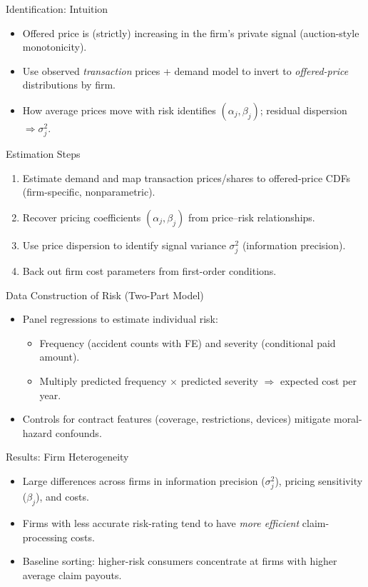 \documentclass[11pt]{beamer}
\begin{document}
\begin{frame}{Identification: Intuition}
\justifying
\begin{itemize}
  \item Offered price is (strictly) increasing in the firm’s private signal (auction-style monotonicity).
  \item Use observed \emph{transaction} prices + demand model to invert to \emph{offered-price} distributions by firm.
  \item How average prices move with risk identifies $(\alpha_j,\beta_j)$; residual dispersion $\Rightarrow \sigma_j^2$.
\end{itemize}
\end{frame}

\begin{frame}{Estimation Steps}
\justifying
\begin{enumerate}
  \item Estimate demand and map transaction prices/shares to offered-price CDFs (firm-specific, nonparametric).
  \item Recover pricing coefficients $(\alpha_j,\beta_j)$ from price–risk relationships.
  \item Use price dispersion to identify signal variance $\sigma_j^2$ (information precision).
  \item Back out firm cost parameters from first-order conditions.
\end{enumerate}
\end{frame}

\begin{frame}{Data Construction of Risk (Two-Part Model)}
\justifying
\begin{itemize}
  \item Panel regressions to estimate individual risk:
  \begin{itemize}
    \item Frequency (accident counts with FE) and severity (conditional paid amount).
    \item Multiply predicted frequency $\times$ predicted severity $\Rightarrow$ expected cost per year.
  \end{itemize}
  \item Controls for contract features (coverage, restrictions, devices) mitigate moral-hazard confounds.
\end{itemize}
\end{frame}

\begin{frame}{Results: Firm Heterogeneity}
\justifying
\begin{itemize}
  \item Large differences across firms in information precision ($\sigma_j^2$), pricing sensitivity ($\beta_j$), and costs.
  \item Firms with less accurate risk-rating tend to have \emph{more efficient} claim-processing costs.
  \item Baseline sorting: higher-risk consumers concentrate at firms with higher average claim payouts.
\end{itemize}
\end{frame}
\end{document}
